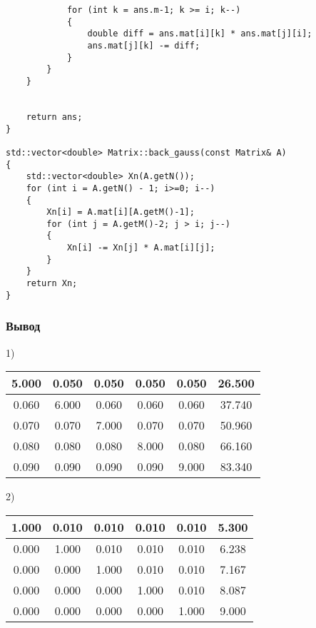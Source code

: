 \documentclass[bachelor, och, pract]{SCWorks}
\begin{document}
\begin{lstlisting}
            for (int k = ans.m-1; k >= i; k--)
            {
                double diff = ans.mat[i][k] * ans.mat[j][i];
                ans.mat[j][k] -= diff;
            }
        }
    }


    return ans;
}

std::vector<double> Matrix::back_gauss(const Matrix& A)
{
    std::vector<double> Xn(A.getN());
    for (int i = A.getN() - 1; i>=0; i--)
    {
        Xn[i] = A.mat[i][A.getM()-1];
        for (int j = A.getM()-2; j > i; j--)
        {
            Xn[i] -= Xn[j] * A.mat[i][j];
        }
    }
    return Xn;
}
\end{lstlisting}

\subsubsection{Вывод}

1)

\begin{table}[h]
    \centering
    \begin{tabular}{|c|c|c|c|c|c|}
\hline 5.000  &   0.050  &    0.050   &   0.050  &  0.050 & 26.500 \\\hline
     0.060  & 6.000 &  0.060 &  0.060  &  0.060 & 37.740\\\hline
     0.070  &    0.070  &    7.000   &  0.070  &  0.070  & 50.960\\\hline
     0.080   &   0.080   &   0.080   &   8.000 &  0.080 & 66.160\\\hline
     0.090 &  0.090 &   0.090 &  0.090 &  9.000  & 83.340 \\\hline
    \end{tabular}
\end{table}

2)

\begin{table}[h]
    \centering
    \begin{tabular}{|c|c|c|c|c|c|}
\hline 1.000   & 0.010 &  0.010  &  0.010 &  0.010 & 5.300\\\hline
     0.000  & 1.000  &  0.010  & 0.010  &  0.010  &  6.238\\\hline
     0.000  & 0.000  & 1.000  &  0.010  &  0.010 &7.167\\\hline
     0.000  & 0.000  &0.000  &  1.000  &  0.010 & 8.087\\\hline
     0.000 &  0.000  &  0.000 &  0.000 &  1.000 & 9.000\\\hline
    \end{tabular}
\end{table}
\end{document}
